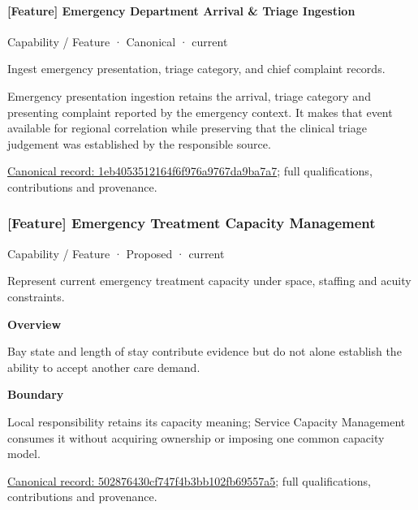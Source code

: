 \paragraph{[Feature] Emergency Department Arrival \& Triage Ingestion}

\label{element:1eb4053512164f6f976a9767da9ba7a7}
{\small Capability / Feature · Canonical · current}\par

Ingest emergency presentation, triage category, and chief complaint records.



Emergency presentation ingestion retains the arrival, triage category and presenting complaint reported by the emergency context. It makes that event available for regional correlation while preserving that the clinical triage judgement was established by the responsible source.


{\footnotesize \href{../../../../continuum/strategy/capability/feature/1eb4053512164f6f976a9767da9ba7a7.md}{Canonical record: 1eb4053512164f6f976a9767da9ba7a7}; full qualifications, contributions and provenance.}\par
\subsubsection{[Feature] Emergency Treatment Capacity Management}

\label{element:502876430cf747f4b3bb102fb69557a5}
{\small Capability / Feature · Proposed · current}\par

Represent current emergency treatment capacity under space, staffing and acuity constraints.



\textbf{Overview}



Bay state and length of stay contribute evidence but do not alone establish the ability to accept another care demand.



\textbf{Boundary}



Local responsibility retains its capacity meaning; Service Capacity Management consumes it without acquiring ownership or imposing one common capacity model.


{\footnotesize \href{../../../../continuum/strategy/capability/feature/502876430cf747f4b3bb102fb69557a5.md}{Canonical record: 502876430cf747f4b3bb102fb69557a5}; full qualifications, contributions and provenance.}\par
